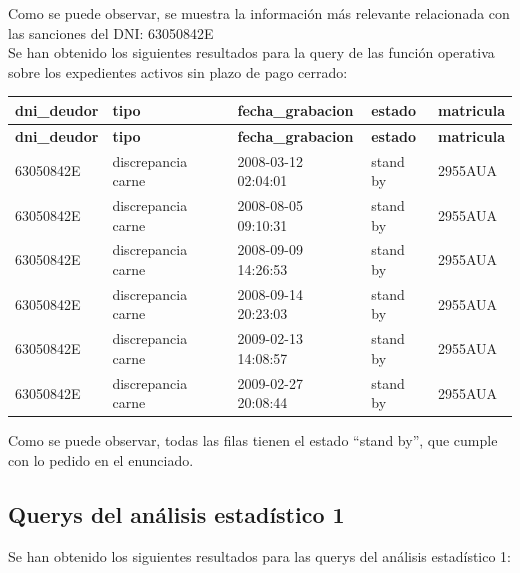 \documentclass[]{article}
\begin{document}
Como se puede observar, se muestra la información más relevante relacionada con las sanciones del DNI: 63050842E \\

Se han obtenido los siguientes resultados para la query de las función operativa sobre los expedientes activos sin plazo de pago cerrado:

\begin{table}[H]
\begin{longtable}{lllll}
    \hline
    \textbf{dni\_deudor} & \textbf{tipo} & \textbf{fecha\_grabacion} & \textbf{estado} & \textbf{matricula} \\ \hline
    \endfirsthead

    \hline
    \textbf{dni\_deudor} & \textbf{tipo} & \textbf{fecha\_grabacion} & \textbf{estado} & \textbf{matricula} \\ \hline
    \endhead
    
    63050842E & discrepancia carne & 2008-03-12 02:04:01 & stand by & 2955AUA \\ \hline
    63050842E & discrepancia carne & 2008-08-05 09:10:31 & stand by & 2955AUA \\ \hline
    63050842E & discrepancia carne & 2008-09-09 14:26:53 & stand by & 2955AUA \\ \hline
    63050842E & discrepancia carne & 2008-09-14 20:23:03 & stand by & 2955AUA \\ \hline
    63050842E & discrepancia carne & 2009-02-13 14:08:57 & stand by & 2955AUA \\ \hline
    63050842E & discrepancia carne & 2009-02-27 20:08:44 & stand by & 2955AUA \\ \hline
    
\end{longtable}
\end{table}

Como se puede observar, todas las filas tienen el estado ``stand by'', que cumple con lo pedido en el enunciado.

\subsection{Querys del análisis estadístico 1}
Se han obtenido los siguientes resultados para las querys del análisis estadístico 1:
\end{document}
